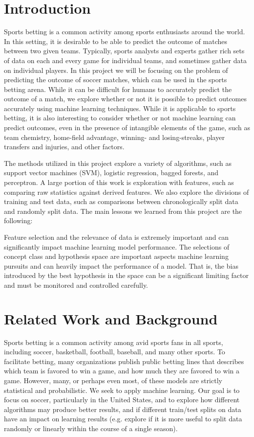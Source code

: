 \section{Introduction} 

Sports betting is a common activity among sports enthusiasts around the world. In this setting, it is desirable to be able to predict the outcome of matches between two given teams. Typically, sports analysts and experts gather rich sets of data on each and every game for individual teams, and sometimes gather data on individual players. In this project we will be focusing on the problem of predicting the outcome of soccer matches, which can be used in the sports betting arena. While it can be difficult for humans to accurately predict the outcome of a match, we explore whether or not it is possible to predict outcomes accurately using machine learning techniques. While it is applicable to sports betting, it is also interesting to consider whether or not machine learning can predict outcomes, even in the presence of intangible elements of the game, such as team chemistry, home-field advantage, winning- and losing-streaks, player transfers and injuries, and other factors.

The methods utilized in this project explore a variety of algorithms, such as support vector machines (SVM), logistic regression, bagged forests, and perceptron. A large portion of this work is exploration with features, such as comparing raw statistics against derived features. We also explore the divisions of training and test data, such as comparisons between chronologically split data and randomly split data. The main lessons we learned from this project are the following:

Feature selection and the relevance of data is extremely important and can significantly impact machine learning model performance.
The selections of concept class and hypothesis space are important aspects machine learning pursuits and can heavily impact the performance of a model. That is, the bias introduced by the best hypothesis in the space can be a significant limiting factor and must be monitored and controlled carefully.

\section {Related Work and Background}
Sports betting is a common activity among avid sports fans in all sports, including soccer, basketball, football, baseball, and many other sports. To facilitate betting, many organizations publish public betting lines that describes which team is favored to win a game, and how much they are favored to win a game. However, many, or perhaps even most, of these models are strictly statistical and probabilistic. We seek to apply machine learning. Our goal is to focus on soccer, particularly in the United States, and to explore how different algorithms may produce better results, and if different train/test splits on data have an impact on learning results (e.g. explore if it is more useful to split data randomly or linearly within the course of a single season).

